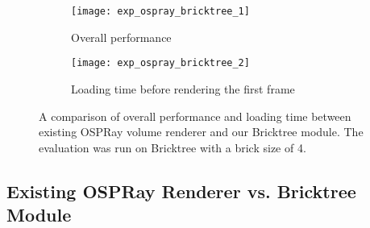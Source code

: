 \begin{figure}[h]
    \centering
    \begin{subfigure}[b]{0.9\columnwidth}
        \texttt{[image: exp\_ospray\_bricktree\_1]}
        \vspace{-1em}
        \caption{Overall performance}
        \label{fig:exp_ospray_bricktree_framerate}
    \end{subfigure}
    \begin{subfigure}[b]{0.9\columnwidth}
        \texttt{[image: exp\_ospray\_bricktree\_2]}
        \vspace{-1em}
        \caption{Loading time before rendering the first frame}
        \label{fig:exp_ospray_bricktree_waitingtime}
    \end{subfigure}
	\caption{\label{fig:exp_ospray_bricktree}%
	A comparison of overall performance and loading time between existing OSPRay volume renderer and our Bricktree module. The evaluation was run on Bricktree with a brick size of 4.}
	\vspace{-1em}
\end{figure}

\subsection{Existing OSPRay Renderer vs. Bricktree Module}

